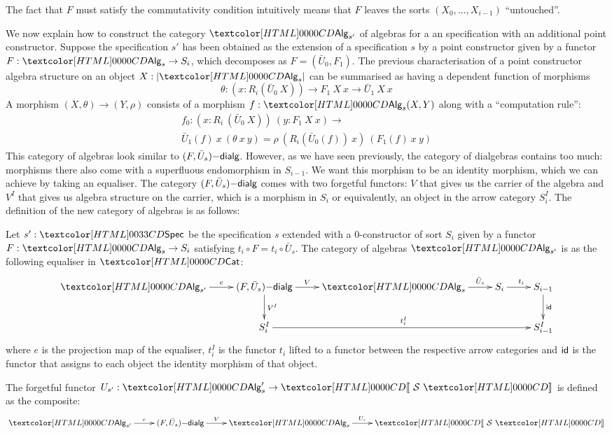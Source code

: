 The fact that $F$ must satisfy the commutativity condition intuitively
means that $F$ leaves the sorts $(X_0, \hdots, X_{i-1})$ ``untouched''.

We now explain how to construct the category $\Alg_{s'}$ of algebras
for a an specification with an additional point constructor. Suppose
the specification $s'$ has been obtained as the extension of a
specification $s$ by a point constructor given by a functor
$F : \Alg_s \to S_i$, which decomposes as $F = (\bar{U}_0, F_1)$. The
previous characterisation of a point constructor algebra structure on
an object $X : | \Alg_s |$ can be summarised as having a dependent
function of morphisms
\[
\theta : (x : R_i (\bar{U}_0\ X)) \to F_1\ X\ x \to \bar{U}_1\ X\ x
\]
A morphism $(X,\theta) \to (Y,\rho)$ consists of a morphism
$f : \Alg_s(X,Y)$ along with a ``computation rule'':
\begin{multline*}
f_0 : (x : R_i \ (\bar{U}_0\ X))\ (y : F_1\ X\ x) \to \\ \bar{U}_1(f)\ x\ (\theta\ x\ y) = \rho\ (R_i(\bar{U}_0(f))\ x)\ (F_1(f)\ x\ y)
\end{multline*}
This category of algebras look similar to
$(F,\bar{U}_s)\mathsf{-dialg}$. However, as we have seen previously, the
category of dialgebras contains too much: morphisms there also come
with a superfluous endomorphism in $S_{i-1}$. We want this morphism to
be an identity morphism, which we can achieve by taking an
equaliser. The category $(F,\bar{U}_s)\mathsf{-dialg}$ comes with two
forgetful functors: $V$ that gives us the carrier of the algebra and
$V^I$ that gives us algebra structure on the carrier, which is a
morphism in $S_i$ or equivalently, an object in the arrow category
$S_i^I$. The definition of the new category of algebras is as follows:

\begin{definition}
  Let $s' : \specty$ be the specification $s$ extended with a
  0-constructor of sort $S_i$ given by a functor $F : \Alg_s \to S_i$
  satisfying $t_i \circ F = t_i \circ \bar{U}_s$. The category of
  algebras $\Alg_{s'}$ is as the following equaliser in $\Cat$:
  \[
  \xymatrix{
    \Alg_{s'} \ar[r]^-{e} &\dialgcat{F}{\bar{U}_s} \ar[r]^-{V} \ar[d]^-{V^I} &\Alg_s \ar[r]^-{\bar{U}_s} &S_i \ar[r]^{t_i} &S_{i-1} \ar[d]^-{\id} \\
    &S_i^I \ar[rrr]^{t_i^I} && &S_{i-1}^I }
  \]
  where $e$ is the projection map of the equaliser, $t_i^I$ is the
  functor $t_i$ lifted to a functor between the respective arrow
  categories and $\mathsf{id}$ is the functor that assigns to each object the
  identity morphism of that object.

The forgetful functor $U_{s'} : \Alg_s' \to \SortCat{\Ss}$ is defined as the composite:
\[
\xymatrix{
    \Alg_{s'} \ar[r]^-{e} &\dialgcat{F}{\bar{U}_s} \ar[r]^-{V} &\Alg_s \ar[r]^-{U_s} &\SortCat{\Ss}
}
\]
\end{definition}

